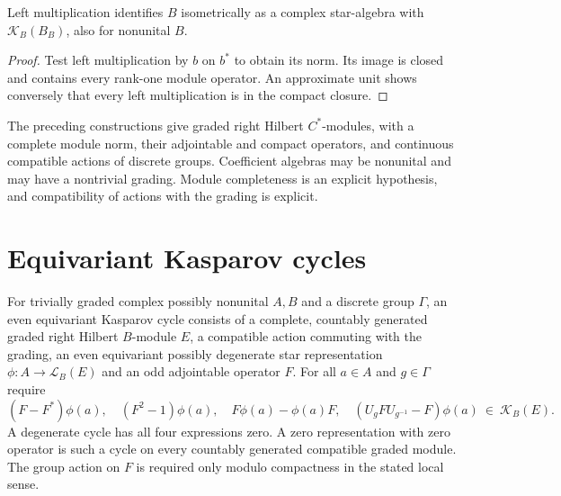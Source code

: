 \begin{proposition}\label{prop:standard-module-compact-algebra}
\leanok
Left multiplication identifies $B$ isometrically as a complex star-algebra
with $\mathcal K_B(B_B)$, also for nonunital $B$.
\end{proposition}
\begin{proof}\leanok
Test left multiplication by $b$ on $b^*$ to obtain its norm. Its image is
closed and contains every rank-one module operator. An approximate unit
shows conversely that every left multiplication is in the compact closure.
\end{proof}

\begin{definition}\label{def:hilbert-modules}
\leanok
The preceding constructions give graded right Hilbert $C^*$-modules,
with a complete module norm, their adjointable and compact operators, and
continuous compatible actions of discrete groups. Coefficient algebras may be
nonunital and may have a nontrivial grading. Module completeness is an explicit
hypothesis, and compatibility of actions with the grading is explicit.
\end{definition}

\section{Equivariant Kasparov cycles}
\begin{definition}\label{def:even-kasparov-cycle}
\leanok
For trivially graded complex possibly nonunital $A,B$ and a discrete group
$\Gamma$, an even equivariant Kasparov cycle consists of a complete,
countably generated graded right Hilbert $B$-module $E$, a compatible action
commuting with the grading, an even equivariant possibly degenerate
star representation $\phi:A\to\mathcal L_B(E)$ and an odd adjointable
operator $F$. For all $a\in A$ and $g\in\Gamma$ require
\[
 (F-F^*)\phi(a),\quad (F^2-1)\phi(a),\quad
 F\phi(a)-\phi(a)F,\quad (U_gFU_{g^{-1}}-F)\phi(a)
 \ \in\ \mathcal K_B(E).
\]
A degenerate cycle has all four expressions zero. A zero representation with
zero operator is such a cycle on every countably generated compatible graded
module. The group action on $F$ is required only modulo compactness in the
stated local sense.
\end{definition}

